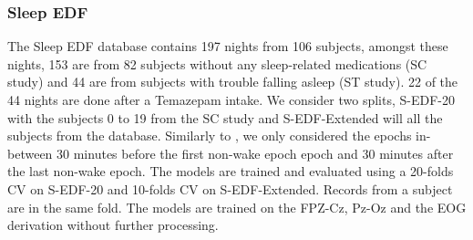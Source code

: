 \documentclass[journal]{IEEEtran}
\begin{document}
\subsubsection{Sleep EDF \cite{sleep_edf}}
The Sleep EDF database contains 197 nights from 106 subjects, amongst these nights, 153 are from 82 subjects without any sleep-related medications (SC study) and 44 are from subjects with trouble falling asleep (ST study). 22 of the 44 nights are done after a Temazepam intake. We consider two splits, S-EDF-20 with the subjects 0 to 19 from the SC study and S-EDF-Extended will all the subjects from the database. Similarly to \cite{Supratak2017} \cite{utime}, we only considered the epochs in-between 30 minutes before the first non-wake epoch epoch and 30 minutes after the last non-wake epoch. The models are trained and evaluated using a 20-folds CV on S-EDF-20 and 10-folds CV on S-EDF-Extended. Records from a subject are in the same fold.
The models are trained on the FPZ-Cz, Pz-Oz and the EOG derivation without further processing.

\begin{table*}[ht]
\centering
{}
\caption{Macro-F1 of the baseline models on MASS and Sleep EDF. For consistency with the literature we report the epoch-wise Macro F1. Moreover, since the computation are done epoch-wise, we cannot report subject variability as in the other tables. (*) are reported on the complete MASS dataset.\textsuperscript{(1)} is trained on F4-EOG and \textsuperscript{(2)} on Fpz-Cz to limit the number of parameters.  }
\label{tab:mass_evaluation}
\vspace{-2.6em}
\end{table*} 
\end{document}
